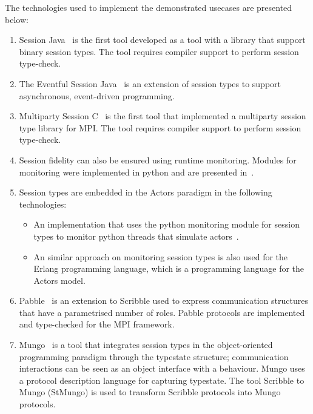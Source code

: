 The technologies used to implement the demonstrated usecases are presented
below:
%
\begin{enumerate}
	\item	Session Java~\cite{HU07TYPE-SAFE} is the first tool
			developed as a tool with a library that support binary session
			types. The tool requires compiler support to perform session
			type-check.

	\item	The Eventful Session Java~\cite{event} is an extension
			of session types to support asynchronous, event-driven programming.

	\item	Multiparty Session C~\cite{NYH12}
			is the first tool that implemented a
			multiparty session type library for MPI.
			The tool requires compiler support to perform session
			type-check.


	\item	Session fidelity can also be ensured using runtime monitoring.
			Modules for monitoring were implemented in python and are presented in~\cite{DBLP:conf/rv/NeykovaYH13}.

	\item	Session types are embedded in the Actors paradigm in the following technologies:
			\begin{itemize}
				\item	An implementation that uses the python monitoring module for session types to
						monitor python threads that simulate actors~\cite{DBLP:conf/coordination/NeykovaY14}.
				\item	An similar approach on monitoring session types is also used for the
						Erlang programming language, which is a programming language for the Actors model.
			\end{itemize}

	\item	Pabble~\cite{DBLP:conf/pdp/NgY14,} is an extension to Scribble used to express
			communication structures that have a parametrised number of roles.
			Pabble protocols are implemented and type-checked for the MPI framework.

	\item	Mungo~\cite{mungo} is a tool that integrates session types in the object-oriented
			programming paradigm through the typestate structure; communication
			interactions can be seen as an object interface with a behaviour.
			Mungo uses a protocol description language for capturing typestate.
			The tool Scribble to Mungo (StMungo) is used to transform Scribble
			protocols into Mungo protocols.



\end{enumerate}
